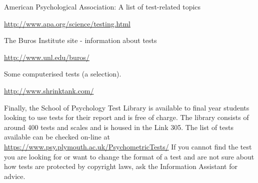 \documentclass[
]{book}
\begin{document}
American Psychological Association: A list of test-related topics

\url{http://www.apa.org/science/testing.html}

The Buros Institute site - information about tests

\url{http://www.unl.edu/buros/}

Some computerised tests (a selection).

\url{http://www.shrinktank.com/}

Finally, the School of Psychology Test Library is available to final year students looking to use tests for their report and is free of charge. The library consists of around 400 tests and scales and is housed in the Link 305. The list of tests available can be checked on-line at \url{https://www.psy.plymouth.ac.uk/PsychometricTests/} If you cannot find the test you are looking for or want to change the format of a test and are not sure about how tests are protected by copyright laws, ask the Information Assistant for advice.

  
\end{document}
